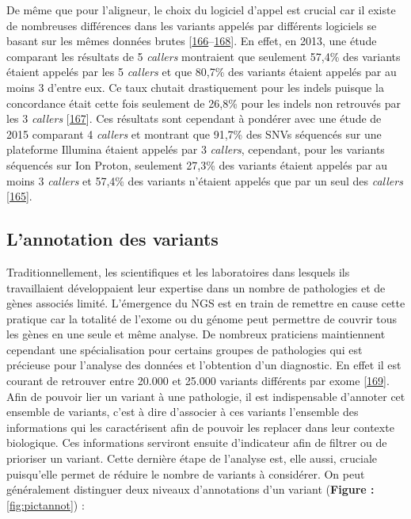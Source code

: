 \documentclass[12pt,a4paper,twoside]{ugathesis}
\theoremstyle{definition}
\theoremstyle{definition}
\theoremstyle{definition}
\theoremstyle{remark}
\begin{document}
De même que pour l'aligneur, le choix du logiciel d'appel est crucial
car il existe de nombreuses différences dans les variants appelés par
différents logiciels se basant sur les mêmes données brutes
{[}\protect\hyperlink{ref-Baes2014}{166}--\protect\hyperlink{ref-Rosenfeld2012}{168}{]}.
En effet, en 2013, une étude comparant les résultats de 5 \emph{callers}
montraient que seulement 57,4\% des variants étaient appelés par les 5
\emph{callers} et que 80,7\% des variants étaient appelés par au moins 3
d'entre eux. Ce taux chutait drastiquement pour les indels puisque la
concordance était cette fois seulement de 26,8\% pour les indels non
retrouvés par les 3 \emph{callers}
{[}\protect\hyperlink{ref-ORawe2013}{167}{]}. Ces résultats sont
cependant à pondérer avec une étude de 2015 comparant 4 \emph{callers}
et montrant que 91,7\% des SNVs séquencés sur une plateforme Illumina
étaient appelés par 3 \emph{callers}, cependant, pour les variants
séquencés sur Ion Proton, seulement 27,3\% des variants étaient appelés
par au moins 3 \emph{callers} et 57,4\% des variants n'étaient appelés
que par un seul des \emph{callers}
{[}\protect\hyperlink{ref-Hwang2015}{165}{]}.

\newpage

\subsection{L'annotation des variants}\label{lannotation-des-variants}

Traditionnellement, les scientifiques et les laboratoires dans lesquels
ils travaillaient développaient leur expertise dans un nombre de
pathologies et de gènes associés limité. L'émergence du NGS est en train
de remettre en cause cette pratique car la totalité de l'exome ou du
génome peut permettre de couvrir tous les gènes en une seule et même
analyse. De nombreux praticiens maintiennent cependant une
spécialisation pour certains groupes de pathologies qui est précieuse
pour l'analyse des données et l'obtention d'un diagnostic. En effet il
est courant de retrouver entre 20.000 et 25.000 variants différents par
exome {[}\protect\hyperlink{ref-Gonzaga-Jauregui2012}{169}{]}. Afin de
pouvoir lier un variant à une pathologie, il est indispensable d'annoter
cet ensemble de variants, c'est à dire d'associer à ces variants
l'ensemble des informations qui les caractérisent afin de pouvoir les
replacer dans leur contexte biologique. Ces informations serviront
ensuite d'indicateur afin de filtrer ou de prioriser un variant. Cette
dernière étape de l'analyse est, elle aussi, cruciale puisqu'elle permet
de réduire le nombre de variants à considérer. On peut généralement
distinguer deux niveaux d'annotations d'un variant (\textbf{Figure :}
\ref{fig:pictannot}) :
\end{document}
